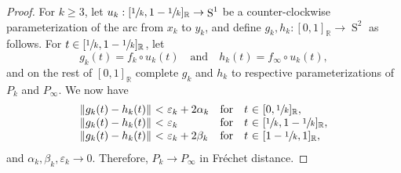 \documentclass[11pt]{article}
\numberwithin{equation}{section}
\let\nicefrac\sfrac
\theoremstyle{remark}
\let\mb\mathbb
\let\eps\varepsilon
\DeclareMathOperator{\sphere}{S}
\begin{document}
\begin{proof}
For $k\geq 3$,
let $u_k : [\nicefrac{1}{k},1-\nicefrac{1}{k}]_\mb{R} \to \sphere^1$ be a counter-clockwise parameterization of the arc from $x_k$ to $y_k$, and define $g_k,h_k : [0,1]_\mb{R} \to \sphere^2$ as follows.
For $t \in [\nicefrac{1}{k},1-\nicefrac{1}{k}]_\mb{R}$, let
\[ g_k(t) = f_k \circ u_k(t) \quad \text{and} \quad h_k(t) = f_\infty \circ u_k(t),\]
and on the rest of $[0,1]_\mb{R}$ complete $g_k$ and $h_k$ to respective parameterizations of $P_k$ and $P_\infty$.
We now have
\[\begin{array}{r@{\ <\ }l@{\quad \text{for}\quad }r@{\ \in\ }l}
\|g_k(t)-h_k(t)\| & \eps_k +2\alpha_k & t & [0,\nicefrac{1}{k}]_\mb{R}, \\
\|g_k(t)-h_k(t)\| & \eps_k & t & [\nicefrac{1}{k},1-\nicefrac{1}{k}]_\mb{R}, \\
\|g_k(t)-h_k(t)\| & \eps_k +2\beta_k & t & [1-\nicefrac{1}{k},1]_\mb{R},
\end{array}\]
and $\alpha_k,\beta_k,\eps_k \to 0$. Therefore, $P_k \to P_\infty$ in Fréchet distance.
\end{proof}
\end{document}
